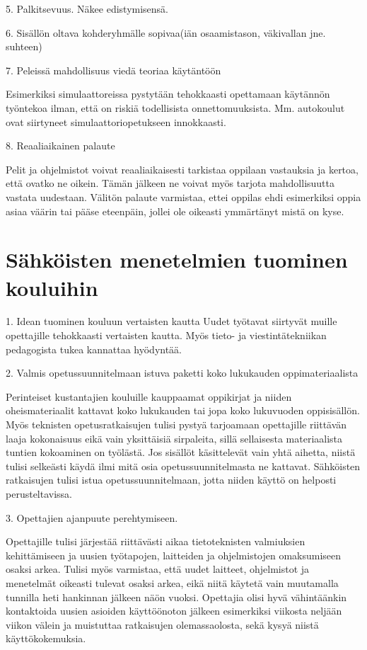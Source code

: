 \documentclass[utf8,bachelor]{gradu3}
\begin{document}
5. Palkitsevuus. Näkee edistymisensä.

6. Sisällön oltava kohderyhmälle sopivaa(iän osaamistason, väkivallan jne. suhteen) 

7. Peleissä mahdollisuus viedä teoriaa käytäntöön

Esimerkiksi simulaattoreissa pystytään tehokkaasti opettamaan käytännön työntekoa ilman, että on riskiä todellisista onnettomuuksista. Mm. autokoulut ovat siirtyneet simulaattoriopetukseen innokkaasti. \parencite[][]{simut}

8. Reaaliaikainen palaute

Pelit ja ohjelmistot voivat reaaliaikaisesti tarkistaa oppilaan vastauksia ja kertoa, että ovatko ne oikein. Tämän jälkeen ne voivat myös tarjota mahdollisuutta vastata uudestaan. Välitön palaute varmistaa, ettei oppilas ehdi esimerkiksi oppia asiaa väärin tai pääse eteenpäin, jollei ole oikeasti ymmärtänyt mistä on kyse.

\section{Sähköisten menetelmien tuominen kouluihin}
1. Idean tuominen kouluun vertaisten kautta
Uudet työtavat siirtyvät muille opettajille tehokkaasti vertaisten kautta.  \parencite[][]{koulunArki} Myös tieto- ja viestintätekniikan pedagogista tukea kannattaa hyödyntää. \parencite[][s. 55-56]{kenttala}

2. Valmis opetussuunnitelmaan istuva paketti koko lukukauden oppimateriaalista

Perinteiset kustantajien kouluille kauppaamat oppikirjat ja niiden oheismateriaalit kattavat koko lukukauden tai jopa koko lukuvuoden oppisisällön. Myös teknisten opetusratkaisujen tulisi pystyä tarjoamaan opettajille riittävän laaja kokonaisuus eikä vain yksittäisiä sirpaleita, sillä sellaisesta materiaalista tuntien kokoaminen on työlästä. Jos sisällöt käsittelevät vain yhtä aihetta, niistä tulisi selkeästi käydä ilmi mitä osia opetussuunnitelmasta ne kattavat. Sähköisten ratkaisujen tulisi istua opetussuunnitelmaan, jotta niiden käyttö on helposti perusteltavissa.

3. Opettajien ajanpuute perehtymiseen.

Opettajille tulisi järjestää riittävästi aikaa tietoteknisten valmiuksien kehittämiseen ja uusien työtapojen, laitteiden ja ohjelmistojen omaksumiseen osaksi arkea. Tulisi myös varmistaa, että uudet laitteet, ohjelmistot ja menetelmät oikeasti tulevat osaksi arkea, eikä niitä käytetä vain muutamalla tunnilla heti hankinnan jälkeen näön vuoksi. Opettajia olisi hyvä vähintäänkin kontaktoida uusien asioiden käyttöönoton jälkeen esimerkiksi viikosta neljään viikon välein ja muistuttaa ratkaisujen olemassaolosta, sekä kysyä niistä käyttökokemuksia.
\end{document}
